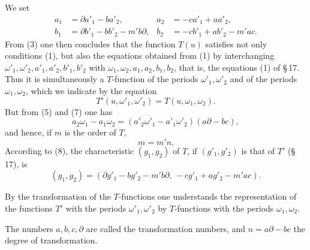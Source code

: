 \documentclass[11pt]{article}
\begin{document}
We set
\begin{align}
a_1&=\partial a'_1-ba'_2,& a_2&=-ca'_1+aa'_2, \tag{7}\\
b_1&=\partial b'_1-bb'_2-m'b\partial,& b_2&=-cb'_1+ab'_2-m'ac. \tag{8}
\end{align}
From (3) one then concludes that the function $T(u)$ satisfies not only conditions (1), but also the equations obtained from (1) by interchanging $\omega'_1,\omega'_2,a'_1,a'_2,b'_1,b'_2$ with $\omega_1,\omega_2,a_1,a_2,b_1,b_2$, that is, the equations (1) of \S\,17. Thus it is simultaneously a $T$-function of the periods $\omega'_1,\omega'_2$ and of the periods $\omega_1,\omega_2$, which we indicate by the equation
\begin{equation}
T'(u,\omega'_1,\omega'_2)=T(u,\omega_1,\omega_2). \tag{9}
\end{equation}
But from (5) and (7) one has
\[
a_2\omega_1-a_1\omega_2=(a'_2\omega'_1-a'_1\omega'_2)(a\partial-bc),
\]
and hence, if $m$ is the order of $T$,
\begin{equation}
m=m'n. \tag{10}
\end{equation}
According to (8), the characteristic $(g_1,g_2)$ of $T$, if $(g'_1,g'_2)$ is that of $T'$ (\S\,17), is
\begin{equation}
(g_1,g_2)=(\partial g'_1-bg'_2-m'b\partial,\,-cg'_1+ag'_2-m'ac). \tag{11}
\end{equation}

By the transformation of the $T$-functions one understands the representation of the functions $T'$ with the periods $\omega'_1,\omega'_2$ by $T$-functions with the periods $\omega_1,\omega_2$.

The numbers $a,b,c,\partial$ are called the transformation numbers, and $n=a\partial-bc$ the degree of transformation.
\end{document}
